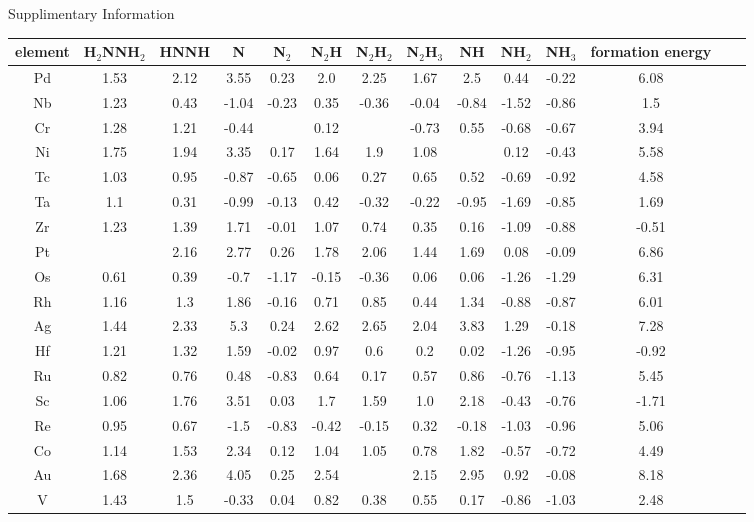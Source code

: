 Supplimentary Information\begin{center}
\begin{tabular}{| c | c | c | c | c | c | c | c | c | c | c | c | c | c |}
\hline
element & H$_2$NNH$_2$ & HNNH & N & N$_2$ & N$_2$H & N$_2$H$_2$ & N$_2$H$_3$ & NH & NH$_2$ & NH$_3$ & formation energy\\
\hline

Pd & 1.53 & 2.12 & 3.55 & 0.23 & 2.0 & 2.25 & 1.67 & 2.5 & 0.44 & -0.22 & 6.08 \\
Nb & 1.23 & 0.43 & -1.04 & -0.23 & 0.35 & -0.36 & -0.04 & -0.84 & -1.52 & -0.86 & 1.5 \\
Cr & 1.28 & 1.21 & -0.44 &  & 0.12 &  & -0.73 & 0.55 & -0.68 & -0.67 & 3.94 \\
Ni & 1.75 & 1.94 & 3.35 & 0.17 & 1.64 & 1.9 & 1.08 &  & 0.12 & -0.43 & 5.58 \\
Tc & 1.03 & 0.95 & -0.87 & -0.65 & 0.06 & 0.27 & 0.65 & 0.52 & -0.69 & -0.92 & 4.58 \\
Ta & 1.1 & 0.31 & -0.99 & -0.13 & 0.42 & -0.32 & -0.22 & -0.95 & -1.69 & -0.85 & 1.69 \\
Zr & 1.23 & 1.39 & 1.71 & -0.01 & 1.07 & 0.74 & 0.35 & 0.16 & -1.09 & -0.88 & -0.51 \\
Pt &  & 2.16 & 2.77 & 0.26 & 1.78 & 2.06 & 1.44 & 1.69 & 0.08 & -0.09 & 6.86 \\
Os & 0.61 & 0.39 & -0.7 & -1.17 & -0.15 & -0.36 & 0.06 & 0.06 & -1.26 & -1.29 & 6.31 \\
Rh & 1.16 & 1.3 & 1.86 & -0.16 & 0.71 & 0.85 & 0.44 & 1.34 & -0.88 & -0.87 & 6.01 \\
Ag & 1.44 & 2.33 & 5.3 & 0.24 & 2.62 & 2.65 & 2.04 & 3.83 & 1.29 & -0.18 & 7.28 \\
Hf & 1.21 & 1.32 & 1.59 & -0.02 & 0.97 & 0.6 & 0.2 & 0.02 & -1.26 & -0.95 & -0.92 \\
Ru & 0.82 & 0.76 & 0.48 & -0.83 & 0.64 & 0.17 & 0.57 & 0.86 & -0.76 & -1.13 & 5.45 \\
Sc & 1.06 & 1.76 & 3.51 & 0.03 & 1.7 & 1.59 & 1.0 & 2.18 & -0.43 & -0.76 & -1.71 \\
Re & 0.95 & 0.67 & -1.5 & -0.83 & -0.42 & -0.15 & 0.32 & -0.18 & -1.03 & -0.96 & 5.06 \\
Co & 1.14 & 1.53 & 2.34 & 0.12 & 1.04 & 1.05 & 0.78 & 1.82 & -0.57 & -0.72 & 4.49 \\
Au & 1.68 & 2.36 & 4.05 & 0.25 & 2.54 &  & 2.15 & 2.95 & 0.92 & -0.08 & 8.18 \\
V & 1.43 & 1.5 & -0.33 & 0.04 & 0.82 & 0.38 & 0.55 & 0.17 & -0.86 & -1.03 & 2.48 \\

\end{tabular}
\end{center}
